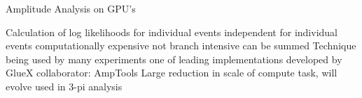 
Amplitude Analysis on GPU's

\I Calculation of log likelihoods for individual events
   \I independent for individual events
   \I computationally expensive
   \I not branch intensive
   \I can be summed
\I Technique being used by many experiments
   \I one of leading implementations developed by GlueX collaborator: AmpTools
\I Large reduction in scale of compute task, will evolve
\I used in 3-pi analysis


